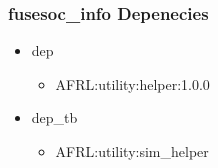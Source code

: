 \subsubsection{fusesoc\_info Depenecies}
\begin{itemize}
\item dep
	\begin{itemize}
	\item AFRL:utility:helper:1.0.0
	\end{itemize}
\item dep\_tb
	\begin{itemize}
	\item AFRL:utility:sim\_helper
	\end{itemize}
\end{itemize}
